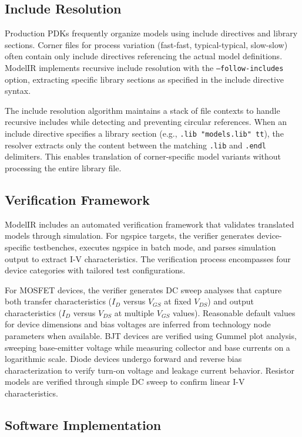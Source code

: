 \documentclass[conference]{IEEEtran}
\begin{document}
\subsection{Include Resolution}

Production PDKs frequently organize models using include directives and library sections. Corner files for process variation (fast-fast, typical-typical, slow-slow) often contain only include directives referencing the actual model definitions. ModelIR implements recursive include resolution with the \texttt{--follow-includes} option, extracting specific library sections as specified in the include directive syntax.

The include resolution algorithm maintains a stack of file contexts to handle recursive includes while detecting and preventing circular references. When an include directive specifies a library section (e.g., \texttt{.lib "models.lib" tt}), the resolver extracts only the content between the matching \texttt{.lib} and \texttt{.endl} delimiters. This enables translation of corner-specific model variants without processing the entire library file.

\subsection{Verification Framework}

ModelIR includes an automated verification framework that validates translated models through simulation. For ngspice targets, the verifier generates device-specific testbenches, executes ngspice in batch mode, and parses simulation output to extract I-V characteristics. The verification process encompasses four device categories with tailored test configurations.

For MOSFET devices, the verifier generates DC sweep analyses that capture both transfer characteristics ($I_D$ versus $V_{GS}$ at fixed $V_{DS}$) and output characteristics ($I_D$ versus $V_{DS}$ at multiple $V_{GS}$ values). Reasonable default values for device dimensions and bias voltages are inferred from technology node parameters when available. BJT devices are verified using Gummel plot analysis, sweeping base-emitter voltage while measuring collector and base currents on a logarithmic scale. Diode devices undergo forward and reverse bias characterization to verify turn-on voltage and leakage current behavior. Resistor models are verified through simple DC sweep to confirm linear I-V characteristics.

\subsection{Software Implementation}
\end{document}
